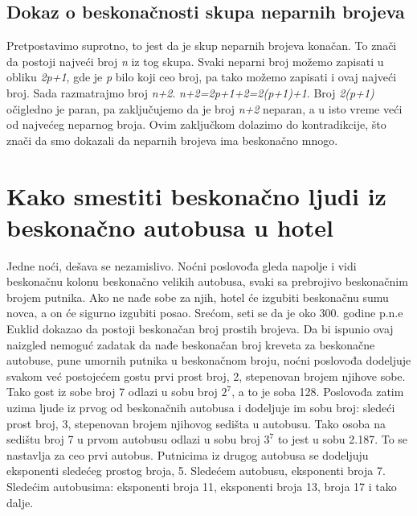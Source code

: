 \documentclass[a4paper]{article}
\begin{document}
\subsection {Dokaz o beskonačnosti skupa neparnih brojeva}
Pretpostavimo suprotno, to jest da je skup neparnih brojeva konačan.
To znači da postoji najveći broj \textit{n} iz tog skupa.
Svaki neparni broj možemo zapisati u obliku \textit{2p+1}, gde je \textit{p} bilo koji ceo broj, pa tako možemo zapisati i ovaj najveći broj.
Sada razmatrajmo broj \textit{n+2}. \textit{n+2=2p+1+2=2(p+1)+1}.
Broj \textit{2(p+1)} očigledno je paran, pa zaključujemo da je broj \textit{n+2} neparan, a u isto vreme veći od najvećeg neparnog broja.
Ovim zaključkom dolazimo do kontradikcije, što znači da smo dokazali da neparnih brojeva ima beskonačno mnogo.




\newpage

\section{Kako smestiti beskonačno ljudi iz beskonačno autobusa u hotel}
\label{poglavlje:Kako smestiti beskonačno ljudi iz beskonačno autobusa u hotel}
Jedne noći, dešava se nezamislivo. Noćni poslovođa gleda napolje i vidi beskonačnu kolonu beskonačno velikih autobusa, svaki sa prebrojivo beskonačnim brojem putnika. Ako ne nađe sobe za njih, hotel će izgubiti beskonačnu sumu novca, a on će sigurno izgubiti posao. Srećom, seti se da je oko 300. godine p.n.e Euklid dokazao da postoji beskonačan broj prostih brojeva. Da bi ispunio ovaj naizgled nemoguć zadatak da nađe beskonačan broj kreveta za beskonačne autobuse, pune umornih putnika u beskonačnom broju, noćni poslovođa dodeljuje svakom već postojećem gostu prvi prost broj, 2, stepenovan brojem njihove sobe. Tako gost iz sobe broj 7 odlazi u sobu broj $2^7$, a to je soba 128. Poslovođa zatim uzima ljude iz prvog od beskonačnih autobusa i dodeljuje im sobu broj: sledeći prost broj, 3, stepenovan brojem njihovog sedišta u autobusu. Tako osoba na sedištu broj 7 u prvom autobusu odlazi u sobu broj $3^7$ to jest u sobu 2.187. To se nastavlja za ceo prvi autobus. Putnicima iz drugog autobusa se dodeljuju eksponenti sledećeg prostog broja, 5. Sledećem autobusu, eksponenti broja 7. Sledećim autobusima: eksponenti broja 11, eksponenti broja 13, broja 17 i tako dalje.
\end{document}
